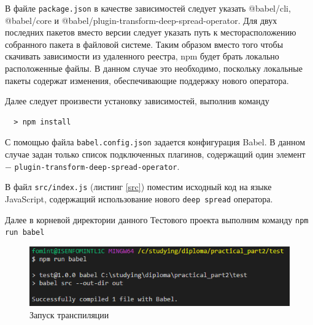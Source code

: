 \documentclass[14pt, a4paper]{article}
\def\code#1{\texttt{#1}} %
\begin{document}

В файле \code{package.json} в качестве зависимостей следует указать @babel/cli, @babel/core и 
@babel/plugin-transform-deep-spread-operator. Для двух последних пакетов вместо версии 
следует указать путь к месторасположению собранного пакета в файловой системе. Таким образом вместо 
того чтобы скачивать зависимости из удаленного реестра, npm будет брать локально расположенные файлы.
В данном случае это необходимо, поскольку локальные пакеты содержат изменения, обеспечивающие поддержку 
нового оператора.


Далее следует произвести установку зависимостей, выполнив команду
\begin{lstlisting}
  > npm install
\end{lstlisting}

С помощью файла \code{babel.config.json} задается конфигурация Babel. В данном случае задан только 
список подключенных плагинов, содержащий один элемент $-$ \code{plugin-transform-deep-spread-operator}.




В файл \code{src/index.js} (листинг \ref{src}) поместим исходный код на языке JavaScript, содержащий 
использование нового \code{deep spread} оператора.



Далее в корневой директории данного Тестового проекта выполним команду \code{npm run babel}

\begin{figure}[H]
  \centering
  \includegraphics[scale=1.0]{img/test_run_babel.PNG}
  \caption{Запуск транспиляции}
  \label{test_run_babel}
\end{figure}
\end{document}
